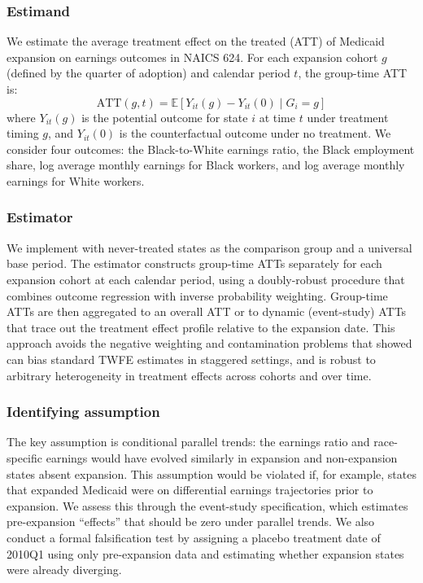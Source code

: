 \documentclass[12pt]{article}
\begin{document}
\subsubsection*{Estimand} We estimate the average treatment effect on the treated (ATT) of Medicaid expansion on earnings outcomes in NAICS 624. For each expansion cohort $g$ (defined by the quarter of adoption) and calendar period $t$, the group-time ATT is:
\begin{equation}
\text{ATT}(g,t) = \mathbb{E}\left[Y_{it}(g) - Y_{it}(0) \mid G_i = g\right]
\end{equation}
where $Y_{it}(g)$ is the potential outcome for state $i$ at time $t$ under treatment timing $g$, and $Y_{it}(0)$ is the counterfactual outcome under no treatment. We consider four outcomes: the Black-to-White earnings ratio, the Black employment share, log average monthly earnings for Black workers, and log average monthly earnings for White workers.

\subsubsection*{Estimator} We implement \citet{callaway2021difference} with never-treated states as the comparison group and a universal base period. The estimator constructs group-time ATTs separately for each expansion cohort at each calendar period, using a doubly-robust procedure that combines outcome regression with inverse probability weighting. Group-time ATTs are then aggregated to an overall ATT or to dynamic (event-study) ATTs that trace out the treatment effect profile relative to the expansion date. This approach avoids the negative weighting and contamination problems that \citet{goodman2021difference} showed can bias standard TWFE estimates in staggered settings, and is robust to arbitrary heterogeneity in treatment effects across cohorts and over time.

\subsubsection*{Identifying assumption} The key assumption is conditional parallel trends: the earnings ratio and race-specific earnings would have evolved similarly in expansion and non-expansion states absent expansion. This assumption would be violated if, for example, states that expanded Medicaid were on differential earnings trajectories prior to expansion. We assess this through the event-study specification, which estimates pre-expansion ``effects'' that should be zero under parallel trends. We also conduct a formal falsification test by assigning a placebo treatment date of 2010Q1 using only pre-expansion data and estimating whether expansion states were already diverging.
\end{document}
